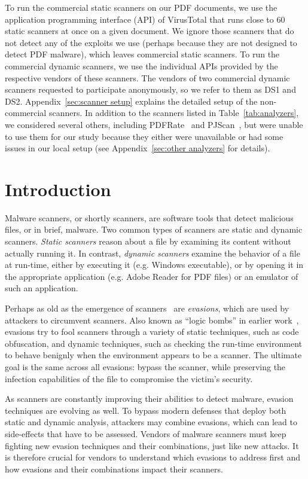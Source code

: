 To run the commercial static scanners on our PDF documents, we use the application programming interface (API) of VirusTotal that runs close to 60 static scanners at once on a given document. We ignore those scanners that do not detect any of the exploits we use (perhaps because they are not designed to detect PDF malware), which leaves \nbVirusTotalEngines{} commercial static scanners.
To run the commercial dynamic scanners, we use the individual APIs provided by the respective vendors of these scanners.
The vendors of two commercial dynamic scanners requested to participate anonymously, so we refer to them as DS1 and DS2.
Appendix~\ref{sec:scanner setup} explains the detailed setup of the non-commercial scanners.
In addition to the scanners listed in Table~\ref{tab:analyzers}, we considered several others,
including PDFRate~\cite{smutz2012malicious} and PJScan~\cite{laskov2011static}, but were unable to use them for our study because they either were unavailable or had some issues in our local setup (see Appendix~\ref{sec:other analyzers} for details).

\section{Introduction}

Malware scanners, or shortly scanners, are software tools that detect malicious files, or in brief, malware.
Two common types of scanners are static and dynamic scanners.
\emph{Static scanners} reason about a file by examining its content without actually running it.
In contrast, \emph{dynamic scanners} examine the behavior of a file at run-time, either by executing it (e.g. Windows executable), or by opening it in the appropriate application (e.g. Adobe Reader for PDF files) or an emulator of such an application.

Perhaps as old as the emergence of scanners~\cite{historyofevasion} are \emph{evasions}, which are used by attackers to circumvent scanners.
Also known as ``logic bombs'' in earlier work~\cite{greenberg1998mobile}, evasions try to fool scanners through a variety of static techniques, such as code obfuscation, and dynamic techniques, such as checking the run-time environment to behave benignly when the environment appears to be a scanner.
The ultimate goal is the same across all evasions: bypass the scanner, while preserving the infection capabilities of the file to compromise the victim's security.

As scanners are constantly improving their abilities to detect malware, evasion techniques are evolving as well. To bypass modern defenses that deploy both static and dynamic analysis, attackers may combine evasions, which can lead to side-effects that have to be assessed.
Vendors of malware scanners must keep fighting new evasion techniques and their combinations, just like new attacks.
It is therefore crucial for vendors to understand which evasions to address first and how evasions and their combinations impact their scanners.

